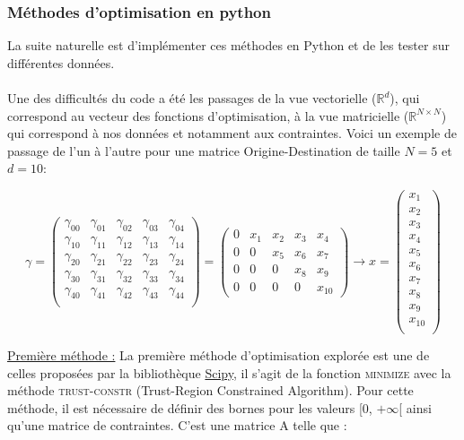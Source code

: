 \documentclass[12pt]{article}
\newcommand{\R}{\mathbb{R}}
\begin{document}
\subsubsection{Méthodes d'optimisation en python}
La suite naturelle est d'implémenter ces méthodes en Python et de les tester sur différentes données.\\
\\
Une des difficultés du code a été les passages de la vue vectorielle ($\R^d$), qui correspond au vecteur des fonctions d'optimisation, à la vue matricielle ($\R^{N\times N}$) qui correspond à nos données et notamment aux contraintes. Voici un exemple de passage de l'un à l'autre pour une matrice Origine-Destination de taille $N=5$ et $d=10$:
\begin{adjustwidth}{-2cm}{-2cm}

\[
\gamma =
\begin{pmatrix}
\gamma_{00} & \gamma_{01} & \gamma_{02} &\gamma_{03} & \gamma_{04}\\
\gamma_{10} & \gamma_{11} & \gamma_{12} &\gamma_{13} & \gamma_{14}\\
\gamma_{20} & \gamma_{21} & \gamma_{22} &\gamma_{23} & \gamma_{24}\\
\gamma_{30} & \gamma_{31} & \gamma_{32} &\gamma_{33} & \gamma_{34}\\
\gamma_{40} & \gamma_{41} & \gamma_{42} &\gamma_{43} & \gamma_{44}\\
\end{pmatrix}
=
\begin{pmatrix}
0 & x_1 & x_2 & x_3 & x_4\\
0 & 0 & x_5 & x_6 & x_7\\
0 & 0 & 0 & x_8 & x_9\\
0 & 0 & 0 & 0 & x_{10}
\end{pmatrix}
\to x = 
\begin{pmatrix}
x_1\\
x_2\\
x_3\\
x_4\\
x_5\\
x_6\\
x_7\\
x_8\\
x_9\\
x_{10}\\
\end{pmatrix}
\]
\end{adjustwidth}
\vspace{0.1cm}
\underline{Première méthode :}
La première méthode d'optimisation explorée est une de celles proposées par la bibliothèque \href{https://docs.scipy.org/doc/scipy/tutorial/optimize.html#id21}{Scipy}, il s'agit de la fonction \textsc{minimize} avec la méthode \textsc{trust-constr} (Trust-Region Constrained Algorithm). Pour cette méthode, il est nécessaire de définir des bornes pour les valeurs [0, $+\infty$[ ainsi qu'une matrice de contraintes. C'est une matrice A telle que :
\end{document}

